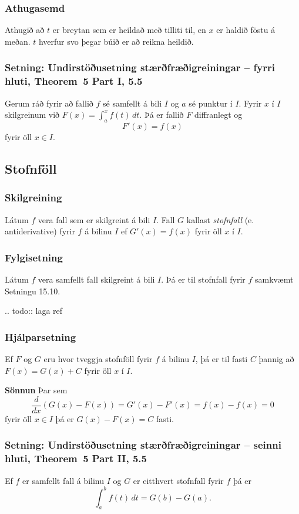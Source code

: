 \documentclass[icelandic,a4paper,12pt]{article}
\begin{document}
\subsubsection{Athugasemd}
Athugið að $t$ er breytan sem er heildað með tilliti til, en
$x$ er haldið föstu á meðan. $t$ hverfur svo þegar búið er að reikna heildið.

\subsubsection{Setning: Undirstöðusetning stærðfræðigreiningar -- fyrri hluti, Theorem~5 Part I, 5.5}
Gerum ráð fyrir að fallið $f$ sé samfellt á bili $I$ og $a$ sé punktur í $I$.  
Fyrir $x$ í $I$ skilgreinum við $F(x)=\int_a^x f(t)\,dt$. Þá er fallið $F$ diffranlegt og 
$$F'(x)=f(x)$$ fyrir öll $x\in I$.

\subsection{Stofnföll}
\subsubsection{Skilgreining} Látum $f$ vera fall sem er skilgreint á bili
$I$.  Fall $G$ kallast \emph{stofnfall} (e. antiderivative) fyrir $f$ á
bilinu $I$ ef $G'(x)=f(x)$ fyrir öll $x$ í $I$.

\subsubsection{Fylgisetning} Látum $f$ vera samfellt fall 
skilgreint á bili $I$.  Þá er til stofnfall fyrir $f$ samkvæmt Setningu 15.10.

.. todo:: laga ref

\subsubsection{Hjálparsetning}
Ef $F$ og $G$ eru hvor tveggja stofnföll fyrir $f$ á bilinu $I$, þá er
til fasti $C$ þannig að $F(x)=G(x)+C$ fyrir öll $x$ í $I$.

\textbf{Sönnun}
Þar sem 
$$ 
\frac{d}{dx}(G(x) - F(x)) = G'(x) - F'(x) = f(x) - f(x) = 0
$$
fyrir öll $x\in I$ þá er $G(x)-F(x) = C$ fasti.

\subsubsection{Setning: Undirstöðusetning stærðfræðigreiningar -- seinni hluti, Theorem~5 Part II, 5.5}
Ef $f$ er samfellt fall á bilinu $I$ og $G$ er eitthvert stofnfall
fyrir $f$ þá er 
$$
  \int_a^b f(t)\,dt=G(b)-G(a).
$$
\end{document}

